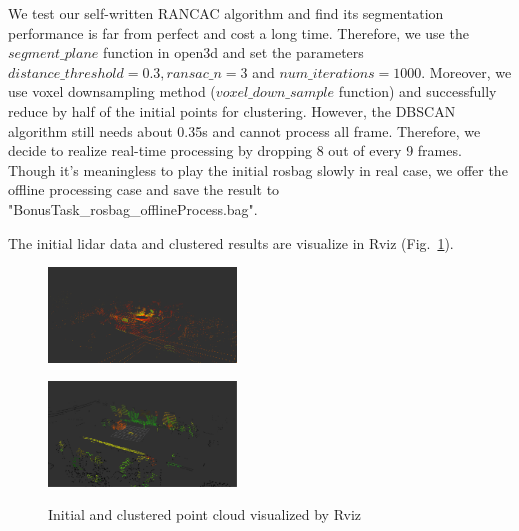 \documentclass[10pt]{article}
\theoremstyle{nonumberplain}
\begin{document}
We test our self-written RANCAC algorithm and find its segmentation performance is far from perfect and cost a long time. Therefore, we use the $segment\_plane$ function in open3d and set the parameters $distance\_threshold=0.3, ransac\_n=3$ and $num\_iterations=1000$. Moreover, we use voxel downsampling method ($voxel\_down\_sample$ function) and successfully reduce by half of the initial points for clustering. However, the DBSCAN algorithm still needs about 0.35s and cannot process all frame. Therefore, we decide to realize real-time processing by dropping 8 out of every 9 frames. Though it's meaningless to play the initial rosbag slowly in real case, we offer the offline processing case and save the result to "BonusTask\_rosbag\_offlineProcess.bag".

The initial lidar data and clustered results are visualize in Rviz (Fig.~\ref{fig8}).


\begin{figure}[H]
	\centering
	\begin{minipage}[t]{0.4\textwidth}
		\centering
		\includegraphics[width=5cm]{fig8b.png}
		\label{fig8a}
	\end{minipage}
	\begin{minipage}[t]{0.4\textwidth}
		\centering
		\includegraphics[width=5cm]{fig8a.png}
		\label{fig8b}
	\end{minipage}
	\caption{Initial and clustered point cloud visualized by Rviz}
	\label{fig8}
\end{figure}











	
\end{document}
